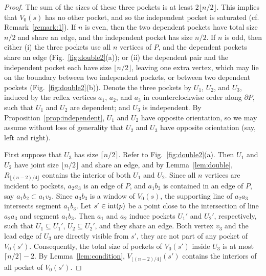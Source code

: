 \documentclass[12pt]{article}
\newcommand{\ceil}[1]{\lceil #1 \rceil}
\newcommand{\floor}[1]{{\lfloor #1 \rfloor}}
\begin{document}
\begin{proof}
The sum of the sizes of these three pockets is at least $2\floor{n/2}$.
This implies that $V_0(s)$ has no other pocket, and so the independent pocket is saturated (cf. Remark~\ref{remark:1}). If $n$ is even, then the two dependent pockets have total size $n/2$ and share an edge, and the independent pocket has size $n/2$.
If $n$ is odd, then either (i) the three pockets use all $n$ vertices of $P$, and the dependent pockets share an edge (Fig.~\ref{fig:double2}(a)); or (ii) the dependent pair and the independent pocket each have size $\floor{n/2}$, leaving one extra vertex, which may lie on the boundary between two independent pockets, or between two dependent pockets (Fig.~\ref{fig:double2}(b)).
Denote the three pockets by $U_1$, $U_2$, and $U_3$, induced by the reflex vertices $a_1$, $a_2$, and $a_3$ in counterclockwise order along $\partial P$, such that $U_1$ and $U_2$ are dependent; and $U_3$ is independent.
By Proposition~\ref{prop:independent}, $U_1$ and $U_2$ have opposite orientation, so we may assume without loss of generality that $U_2$ and $U_3$ have opposite orientation (say, left and right).

First suppose that $U_3$ has size $\ceil{n/2}$. Refer to Fig.~\ref{fig:double2}(a). Then $U_1$ and $U_2$ have joint size $\floor{n/2}$ and share an edge, and by Lemma~\ref{lem:double}, $R_{\floor{(n-2)/4}}$ contains the interior of both $U_1$ and $U_2$. Since all $n$ vertices are incident to pockets, $a_2a_3$ is an edge of $P$, and $a_1b_3$ is contained in an edge of $P$, say $a_1b_2 \subset a_1v_3$. Since $a_3b_3$ is a window of $V_0(s)$, the supporting line of $a_2a_3$ intersects segment $a_1b_3$. Let $s'\in {\rm int}(p)$ be a point close to the intersection of line $a_2a_3$ and segment $a_1b_3$. Then $a_1$ and $a_2$ induce pockets $U_1'$ and $U_2'$, respectively, such that $U_1\subseteq U_1'$, $U_2\subseteq U_2'$, and they share an edge. Both vertex $v_3$ and the lead edge of $U_3$ are directly visible from $s'$, they are not part of any pocket of $V_0(s')$. Consequently, the total size of pockets of $V_0(s')$ inside $U_3$ is at most $\ceil{n/2}-2$. By Lemma~\ref{lem:condition}, $V_{\floor{(n-2)/4}}(s')$ contains the interiors of all pocket of $V_0(s')$.


\end{proof}
\end{document}
